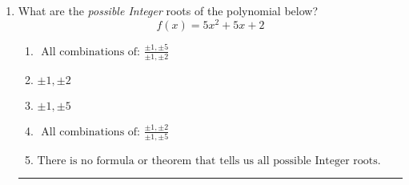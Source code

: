 \documentclass[14pt]{extbook}
\newcommand{\litem}[1]{\item#1\hspace*{-1cm}\rule{\textwidth}{0.4pt}}
\begin{document}
\begin{enumerate}
{\begin{enumerate}[label=\Alph*.]
\end{enumerate} }
\litem{
What are the \textit{possible Integer} roots of the polynomial below?\[ f(x) = 5x^{2} +5 x + 2 \]\begin{enumerate}[label=\Alph*.]
\item \( \text{ All combinations of: }\frac{\pm 1,\pm 5}{\pm 1,\pm 2} \)
\item \( \pm 1,\pm 2 \)
\item \( \pm 1,\pm 5 \)
\item \( \text{ All combinations of: }\frac{\pm 1,\pm 2}{\pm 1,\pm 5} \)
\item \( \text{There is no formula or theorem that tells us all possible Integer roots.} \)

\end{enumerate} }
\end{enumerate}
\end{document}
